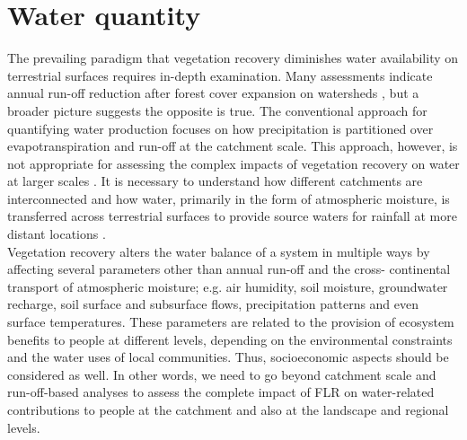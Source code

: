 \section{\Large Water quantity } \label{sec:water-quant}

The prevailing paradigm that vegetation recovery diminishes water availability on terrestrial surfaces requires in-depth examination. Many assessments indicate annual run-off reduction after forest cover expansion on watersheds \citep{Filoso2017}, but a broader picture suggests the opposite is true. The conventional approach for quantifying water production focuses on how precipitation is partitioned over evapotranspiration and run-off at the catchment scale. This approach, however, is not appropriate for assessing the complex impacts of vegetation recovery on water at larger scales \citep{Ellison2012}. It is necessary to understand how different catchments are interconnected and how water, primarily in the form of atmospheric moisture, is transferred across terrestrial surfaces to provide source waters for rainfall at more distant locations \citep{Ellison2018}. \\
\indent Vegetation recovery alters the water balance of a system in multiple ways by affecting several parameters other than annual run-off and the cross- continental transport of atmospheric moisture; e.g. air humidity, soil moisture, groundwater recharge, soil surface and subsurface flows, precipitation patterns and even surface temperatures. These parameters are related to the provision of ecosystem benefits to people at different levels, depending on the environmental constraints and the water uses of local communities. Thus, socioeconomic aspects should be considered as well. In other words, we need to go beyond catchment scale and run-off-based analyses to assess the complete impact of FLR on water-related contributions to people at the catchment and also at the landscape and regional levels. \\
